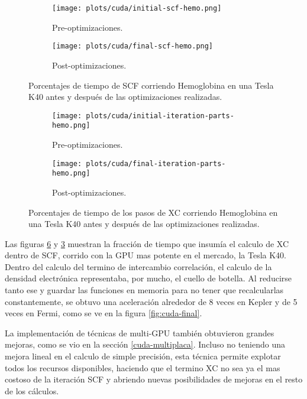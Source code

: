 \begin{figure}[htbp]
\centering
\begin{subfigure}[b]{\plotwidthtres}
   \texttt{[image: plots/cuda/initial-scf-hemo.png]}
   \caption{Pre-optimizaciones.}
   \label{fig:initial-cuda-scf}
 \end{subfigure}
 \begin{subfigure}[b]{\plotwidthtres}
   \texttt{[image: plots/cuda/final-scf-hemo.png]}
   \caption{Post-optimizaciones.}
   \label{fig:final-cuda-scf}
 \end{subfigure}
 \caption{Porcentajes de tiempo de SCF corriendo Hemoglobina en una Tesla K40 antes y despu\'es de
 las optimizaciones realizadas.}
 \label{fig:cuda-scf}
\end{figure}

\begin{figure}[htbp]
\centering
\begin{subfigure}[b]{\plotwidthtres}
   \texttt{[image: plots/cuda/initial-iteration-parts-hemo.png]}
   \caption{Pre-optimizaciones.}
   \label{fig:initial-cuda-parts}
 \end{subfigure}
 \begin{subfigure}[b]{\plotwidthtres}
   \texttt{[image: plots/cuda/final-iteration-parts-hemo.png]}
   \caption{Post-optimizaciones.}
   \label{fig:final-cuda-parts}
 \end{subfigure}
 \caption{Porcentajes de tiempo de los pasos de XC corriendo Hemoglobina en una Tesla K40 antes y despu\'es de
 las optimizaciones realizadas.}
 \label{fig:cuda-parts}
\end{figure}

Las figuras \ref{fig:cuda-parts} y \ref{fig:cuda-scf} muestran la fracci\'on de tiempo que insum\'ia el
calculo de XC dentro de SCF, corrido con la GPU mas potente en el mercado, la Tesla K40.
Dentro del calculo del termino de intercambio correlaci\'on, el calculo de la densidad electr\'onica
representaba, por mucho, el cuello de botella. Al reducirse tanto ese y guardar las funciones en
memoria para no tener que recalcularlas constantemente, se obtuvo una aceleraci\'on alrededor de 8
veces en Kepler y de 5 veces en Fermi, como se ve en la figura \ref{fig:cuda-final}.

La implementaci\'on de t\'ecnicas de multi-GPU tambi\'en obtuvieron grandes mejoras, como se vio en la
secci\'on \ref{cuda-multiplaca}. Incluso no teniendo una mejora lineal en el calculo de simple
precisi\'on, esta t\'ecnica permite explotar todos los recursos disponibles, haciendo que el termino
XC no sea ya el mas costoso de la iteraci\'on SCF y abriendo nuevas posibilidades de mejoras en el
resto de los c\'alculos.

